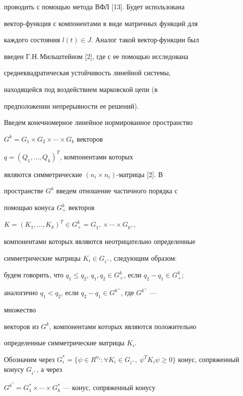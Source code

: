 проводить с помощью метода ВФЛ [13]. Будет использована  


вектор-функция с компонентами в виде матричных функций для  


каждого состояния $l(t)\in J$. Аналог такой вектор-функции был  


введен Г.Н.\,Мильштейном [2], где с ее помощью исследована  


среднеквадратическая устойчивость линейной системы, 


находящейся под воздействием марковской цепи (в 


предположении непрерывности ее решений). 


 


Введем конечномерное линейное нормированное пространство  


$G^k=G_1\times G_2\times\dotsb\times G_k$ векторов 


$q=(Q_1,\dotsc,Q_k)^T$, компонентами которых 


являются симметрические $(n_i\times n_i)$-матрицы [2]. В  


пространстве $G^k$ введем отношение частичного порядка с  


помощью конуса $G^k_+$ векторов 


$K=(K_1,\dotsc,K_k)^T\in G^k_+=G_{1^+}\times\dotsb\times G_{k^+}$, 


компонентами которых являются неотрицательно определенные  


симметрические матрицы $K_i\in G_{i^+}$, следующим образом: 


будем говорить, что $q_1\le q_2$, $q_1,q_2\in G^k_+$, если $q_2-q_1\in 


G^k_+$; 


аналогично $q_1<q_2$, если $q_2-q_1\in G^{k^+}$, где $G^{k^+}$ --- 


множество 


векторов из $G^k$, компонентами которых являются положительно 


определенные симметрические матрицы $K_i$. 


 


 


Обозначим через $G^*_i=\{\psi\in R^{n_i}:\forall K_i\in G_{i^+},\ 


\psi^T K_i\psi\ge 0\}$ конус, сопряженный конусу $G_{i^+}$, а через 


$G^{k^*}=G^*_1\times\dotsb\times G^*_k$ --- конус, сопряженный конусу 


